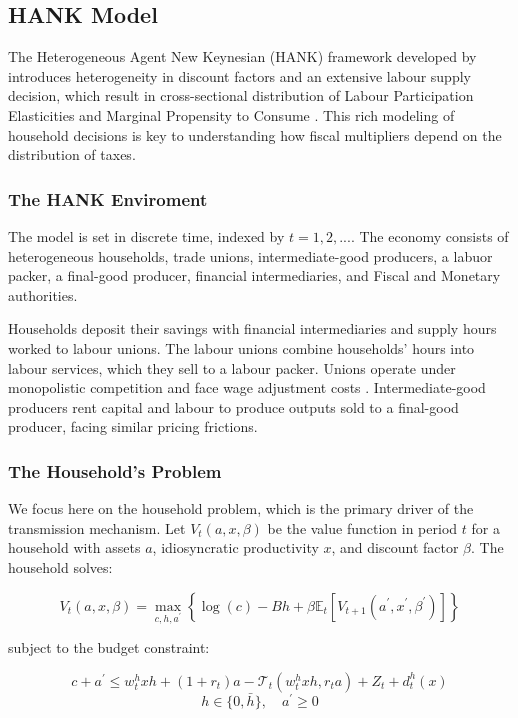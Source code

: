 \documentclass[12pt,letterpaper]{article}
\begin{document}
\subsection{HANK Model}
The Heterogeneous Agent New Keynesian (HANK) framework developed by \cite{FN} introduces heterogeneity in discount factors and an extensive labour supply decision, which result in cross-sectional distribution of Labour Participation Elasticities and Marginal Propensity to Consume . This rich modeling of household decisions is key to understanding how fiscal multipliers depend on the distribution of taxes.
\\
\subsubsection{The HANK Enviroment}
The model is set in discrete time, indexed by $t = 1,2,...$. The economy consists of heterogeneous households, trade unions, intermediate-good producers, a labuor packer, a final-good producer, financial intermediaries, and Fiscal and Monetary authorities.

Households deposit their savings with financial intermediaries and supply hours worked to labour unions. The labour unions combine households' hours into labour services, which they sell to a labour packer. Unions operate under monopolistic competition and face wage adjustment costs \cite{Rotemberg1982}. Intermediate-good producers rent capital and labour to produce outputs sold to a final-good producer, facing similar pricing frictions.

\subsubsection{The Household's Problem}
We focus here on the household problem, which is the primary driver of the transmission mechanism. Let $V_t (a,x,\beta)$ be the value function in period $t$ for a household with assets $a$, idiosyncratic productivity $x$, and discount factor $\beta$. The household solves:

\begin{equation}
    V_t(a,x,\beta) = \max_{c,h,a^\prime} \left\{ \log(c) - B h + \beta \mathbb{E}_t [V_{t+1}(a^\prime,x^\prime,\beta^\prime)] \right\}
    \label{eq:value_function}
\end{equation}

subject to the budget constraint:

\begin{equation}
    c + a^\prime \leq w^h_t x h + (1 + r_t)a - \mathcal{T}_t(w^h_t x h, r_t a) + Z_t + d^h_t(x)
\end{equation}
\begin{equation}
    h \in \{ 0, \bar{h} \}, \quad a^\prime \geq 0
\end{equation}
\end{document}
